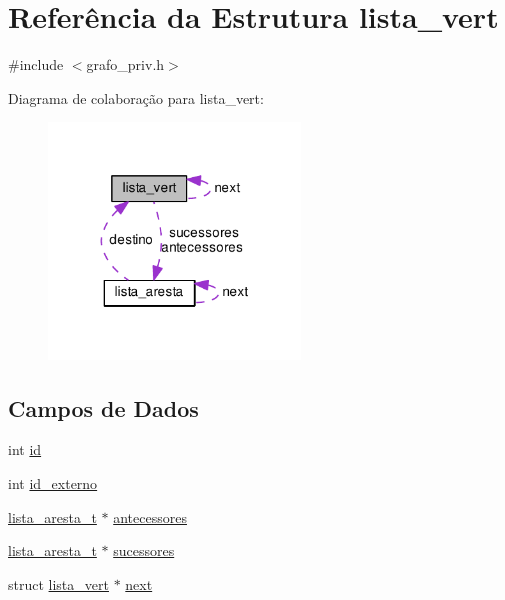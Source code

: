 \hypertarget{structlista__vert}{}\section{Referência da Estrutura lista\+\_\+vert}
\label{structlista__vert}


{\ttfamily \#include $<$grafo\+\_\+priv.\+h$>$}



Diagrama de colaboração para lista\+\_\+vert\+:
\nopagebreak
\begin{figure}[H]
\begin{center}
\leavevmode
\includegraphics[width=190pt]{structlista__vert__coll__graph}
\end{center}
\end{figure}
\subsection*{Campos de Dados}
\begin{DoxyCompactItemize}
\item 
int \hyperlink{structlista__vert_acce74c81e9c5ed24ff7bc175e22a7079}{id}
\item 
int \hyperlink{structlista__vert_a4741315d4db64dad0ee3b59d8f5a4951}{id\+\_\+externo}
\item 
\hyperlink{grafo__priv_8h_a8c99b03365ae7f753c4cf1a20d9e9257}{lista\+\_\+aresta\+\_\+t} $\ast$ \hyperlink{structlista__vert_a39a423ac0ec49cb5bcca3c73c353db19}{antecessores}
\item 
\hyperlink{grafo__priv_8h_a8c99b03365ae7f753c4cf1a20d9e9257}{lista\+\_\+aresta\+\_\+t} $\ast$ \hyperlink{structlista__vert_ac003e2d2beffcf2432cac5460cf82263}{sucessores}
\item 
struct \hyperlink{structlista__vert}{lista\+\_\+vert} $\ast$ \hyperlink{structlista__vert_a772eebf412b0d7e40a73f5989e6a1835}{next}
\end{DoxyCompactItemize}


